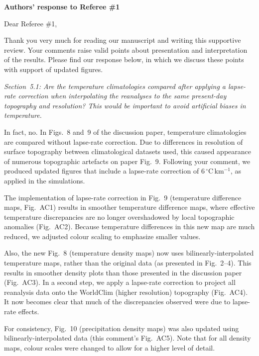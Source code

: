 \documentclass[10pt]{article}
\begin{document}
\textbf{Authors' response to Referee {\#}1}
\bigskip


\renewcommand\thefigure{AC\arabic{figure}}
\def\referee#1{\bigskip\textcolor{journalname}{\textit{#1}}}

Dear Referee {\#}1,

Thank you very much for reading our manuscript and writing this supportive review. Your comments raise valid points about presentation and interpretation of the results. Please find our response below, in which we discuss these points with support of updated figures.

\referee{Section~5.1: Are the temperature climatologies compared after applying a lapse-rate correction when interpolating the reanalyses to the same present-day topography and resolution? This would be important to avoid artificial biases in temperature.}

In fact, no. In Figs.~8 and~9 of the discussion paper, temperature climatologies are compared without lapse-rate correction. Due to differences in resolution of surface topography between climatological datasets used, this caused appearance of numerous topographic artefacts on paper Fig.~9. Following your comment, we produced updated figures that include a lapse-rate correction of 6\,{$^\circ$}C\,km$^{-1}$, as applied in the simulations.

The implementation of lapse-rate correction in Fig.~9 (temperature difference maps, Fig.~AC1) results in smoother temperature difference maps, where effective temperature discrepancies are no longer overshadowed by local topographic anomalies (Fig.~AC2). Because temperature differences in this new map are much reduced, we adjusted colour scaling to emphasize smaller values.

Also, the new Fig.~8 (temperature density maps) now uses bilinearly-interpolated temperature maps, rather than the original data (as presented in Fig.~2--4). This results in smoother density plots than those presented in the discussion paper (Fig.~AC3). In a second step, we apply a lapse-rate correction to project all reanalysis data onto the WorldClim (higher resolution) topography (Fig.~AC4). It now becomes clear that much of the discrepancies observed were due to lapse-rate effects.

For consistency, Fig.~10 (precipitation density maps) was also updated using bilinearly-interpolated data (this comment's Fig.~AC5). Note that for all density maps, colour scales were changed to allow for a higher level of detail.
\end{document}
